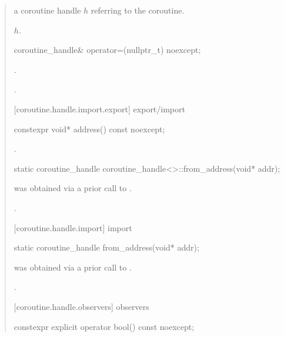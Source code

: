 \begin{quote}
\begin{itemdescr}
	\pnum
  \returns a coroutine handle $h$ referring to the coroutine.
  
  \pnum\postconditions {}$h$.
\end{itemdescr}

\begin{itemdecl}
  coroutine_handle& operator=(nullptr_t) noexcept;
\end{itemdecl}
\begin{itemdescr}
	\pnum\postconditions {}.
  
  \pnum\returns {}.
\end{itemdescr}

[coroutine.handle.import.export]{ export/import}

\begin{itemdecl}
  constexpr void* address() const noexcept;
\end{itemdecl}

\begin{itemdescr}
	\pnum
	\returns {}.
\end{itemdescr}


\begin{itemdecl}
  static coroutine_handle coroutine_handle<>::from_address(void* addr);		
\end{itemdecl}

\begin{itemdescr}
	\pnum
	\precondition {} was obtained via a prior call to .
	
	\pnum
	\postconditions {}.
\end{itemdescr}

[coroutine.handle.import]{ import}

\begin{itemdecl}
  static coroutine_handle from_address(void* addr);
\end{itemdecl}

\begin{itemdescr}
 \pnum
 \precondition {} was obtained via a prior call to .

 \pnum
 \postconditions {}.
\end{itemdescr}

[coroutine.handle.observers]{ observers}
\begin{itemdecl}
  constexpr explicit operator bool() const noexcept;
\end{itemdecl}


\end{quote}
